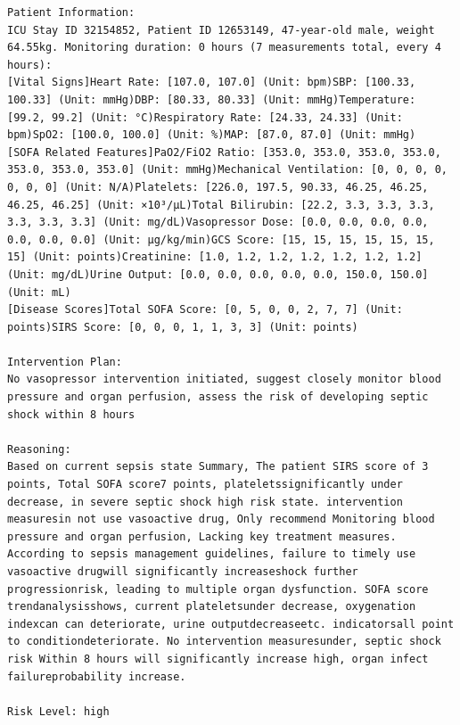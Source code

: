 \documentclass{article}
\begin{document}
\begin{lstlisting}[caption={Result for Patient 32154852}, label={lst:32154852}]
Patient Information:
ICU Stay ID 32154852, Patient ID 12653149, 47-year-old male, weight 64.55kg. Monitoring duration: 0 hours (7 measurements total, every 4 hours):
[Vital Signs]Heart Rate: [107.0, 107.0] (Unit: bpm)SBP: [100.33, 100.33] (Unit: mmHg)DBP: [80.33, 80.33] (Unit: mmHg)Temperature: [99.2, 99.2] (Unit: °C)Respiratory Rate: [24.33, 24.33] (Unit: bpm)SpO2: [100.0, 100.0] (Unit: %)MAP: [87.0, 87.0] (Unit: mmHg)
[SOFA Related Features]PaO2/FiO2 Ratio: [353.0, 353.0, 353.0, 353.0, 353.0, 353.0, 353.0] (Unit: mmHg)Mechanical Ventilation: [0, 0, 0, 0, 0, 0, 0] (Unit: N/A)Platelets: [226.0, 197.5, 90.33, 46.25, 46.25, 46.25, 46.25] (Unit: ×10³/μL)Total Bilirubin: [22.2, 3.3, 3.3, 3.3, 3.3, 3.3, 3.3] (Unit: mg/dL)Vasopressor Dose: [0.0, 0.0, 0.0, 0.0, 0.0, 0.0, 0.0] (Unit: μg/kg/min)GCS Score: [15, 15, 15, 15, 15, 15, 15] (Unit: points)Creatinine: [1.0, 1.2, 1.2, 1.2, 1.2, 1.2, 1.2] (Unit: mg/dL)Urine Output: [0.0, 0.0, 0.0, 0.0, 0.0, 150.0, 150.0] (Unit: mL)
[Disease Scores]Total SOFA Score: [0, 5, 0, 0, 2, 7, 7] (Unit: points)SIRS Score: [0, 0, 0, 1, 1, 3, 3] (Unit: points)

Intervention Plan:
No vasopressor intervention initiated, suggest closely monitor blood pressure and organ perfusion, assess the risk of developing septic shock within 8 hours

Reasoning:
Based on current sepsis state Summary, The patient SIRS score of 3 points, Total SOFA score7 points, plateletssignificantly under decrease, in severe septic shock high risk state. intervention measuresin not use vasoactive drug, Only recommend Monitoring blood pressure and organ perfusion, Lacking key treatment measures. According to sepsis management guidelines, failure to timely use vasoactive drugwill significantly increaseshock further progressionrisk, leading to multiple organ dysfunction. SOFA score trendanalysisshows, current plateletsunder decrease, oxygenation indexcan can deteriorate, urine outputdecreaseetc. indicatorsall point to conditiondeteriorate. No intervention measuresunder, septic shock risk Within 8 hours will significantly increase high, organ infect failureprobability increase.

Risk Level: high
\end{lstlisting}
\end{document}
